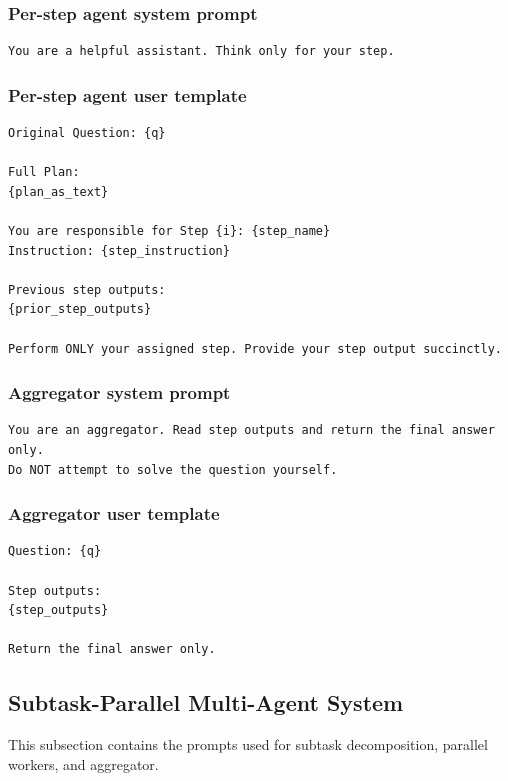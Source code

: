 \documentclass{article} %
\begin{document}
\subsubsection{Per-step agent system prompt}
\begin{lstlisting}[style=promptstyle]
You are a helpful assistant. Think only for your step.
\end{lstlisting}

\subsubsection{Per-step agent user template}
\begin{lstlisting}[style=promptstyle]
Original Question: {q}

Full Plan:
{plan_as_text}

You are responsible for Step {i}: {step_name}
Instruction: {step_instruction}

Previous step outputs:
{prior_step_outputs}

Perform ONLY your assigned step. Provide your step output succinctly.
\end{lstlisting}

\subsubsection{Aggregator system prompt}
\begin{lstlisting}[style=promptstyle]
You are an aggregator. Read step outputs and return the final answer only.
Do NOT attempt to solve the question yourself.
\end{lstlisting}

\subsubsection{Aggregator user template}
\begin{lstlisting}[style=promptstyle]
Question: {q}

Step outputs:
{step_outputs}

Return the final answer only.
\end{lstlisting}

\subsection{Subtask-Parallel Multi-Agent System}
This subsection contains the prompts used for subtask decomposition, parallel workers, and aggregator.
\end{document}
